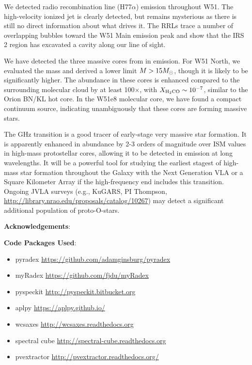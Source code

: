 We detected radio recombination line (H77$\alpha$) emission throughout W51.
The \citet{Lacy2007a} high-velocity ionized jet is clearly detected, but
remains mysterious as there is still no direct information about what drives
it.  The RRLs trace a number of overlapping bubbles toward the W51 Main
emission peak and show that the IRS 2 region has excavated a cavity along our
line of sight.

We have detected the three massive cores from \citet{Zhang1997a} in
\formaldehyde \twotwo emission.  For W51 North, we evaluated the mass and
derived a lower limit $M>15 M_{\odot}$, though it is likely to be significantly
higher.  The \formaldehyde abundance in these cores is enhanced compared to the
surrounding molecular cloud by at least 100$\times$, with $X_{\textrm{H}_2\textrm{CO}}
\sim 10^{-7}$, similar to the Orion BN/KL hot core.  In the W51e8 molecular
core, we have found a compact continuum source, indicating unambiguously that
these cores are forming massive stars.

The \formaldehyde {} GHz transition is a good tracer of early-stage
very massive star formation.  It is apparently enhanced in abundance by 2-3
orders of magnitude over ISM values in high-mass protostellar cores, allowing
it to be detected in emission at long wavelengths.  It will be a powerful tool
for studying the earliest stagest of high-mass star formation throughout the
Galaxy with the Next Generation VLA or a Square Kilometer Array if the
high-frequency end includes this transition.  Ongoing JVLA surveys (e.g.,
KuGARS, PI Thompson, \url{http://library.nrao.edu/proposals/catalog/10267}) may
detect a significant additional population of proto-O-stars.




\textbf{Acknowledgements}:

\textbf{Code Packages Used}:

\begin{itemize}
    \item pyradex \url{https://github.com/adamginsburg/pyradex}
    \item myRadex \url{https://github.com/fjdu/myRadex}
    \item pyspeckit \url{http://pyspeckit.bitbucket.org}
    \item aplpy \url{https://aplpy.github.io/}
    \item wcsaxes \url{http://wcsaxes.readthedocs.org}
    \item spectral cube \url{http://spectral-cube.readthedocs.org}
    \item pvextractor \url{http://pvextractor.readthedocs.org/}
\end{itemize}

